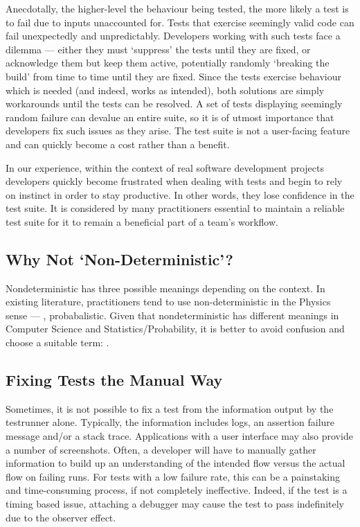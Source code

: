 Anecdotally, the higher-level the behaviour being tested, the more likely a test
is to fail due to inputs unaccounted for. Tests that exercise seemingly valid
code can fail unexpectedly and unpredictably. Developers working with such tests
face a dilemma --- either they must {\lq}suppress{\rq} the tests until they are
fixed, or acknowledge them but keep them active, potentially randomly
{\lq}breaking the build{\rq} from time to time until they are fixed. Since the
tests exercise behaviour which is needed (and indeed, works as intended), both
solutions are simply workarounds until the tests can be resolved. A set of tests
displaying seemingly random failure can devalue an entire suite, so it is of
utmost importance that developers fix such issues as they arise. The test suite
is not a user-facing feature and can quickly become a cost rather than a
benefit.

In our experience, within the context of real software development projects
developers quickly become frustrated when dealing with \flaky tests and begin to
rely on instinct in order to stay productive. In other words, they lose
confidence in the test suite. It is considered by many practitioners essential
to maintain a reliable test suite for it to remain a beneficial part of a team's
workflow.


\subsection{Why Not {\lq}Non-Deterministic{\rq}?}

Nondeterministic has three possible meanings depending on the context. In
existing literature, practitioners tend to use non-deterministic in the Physics
sense --- \ie, probabalistic. Given that nondeterministic has different meanings
in Computer Science and Statistics/Probability, it is better to avoid confusion
and choose a suitable term: \flaky.


\subsection{Fixing \Flaky Tests the Manual Way}

Sometimes, it is not possible to fix a \flaky test from the information output
by the testrunner alone. Typically, the information includes logs, an assertion
failure message and/or a stack trace. Applications with a user interface may
also provide a number of screenshots. Often, a developer will have to manually
gather information to build up an understanding of the intended flow versus the
actual flow on failing runs. For \flaky tests with a low failure rate, this can
be a painstaking and time-consuming process, if not completely ineffective.
Indeed, if the \flaky test is a timing based issue, attaching a debugger may
cause the test to pass indefinitely due to the observer effect.

